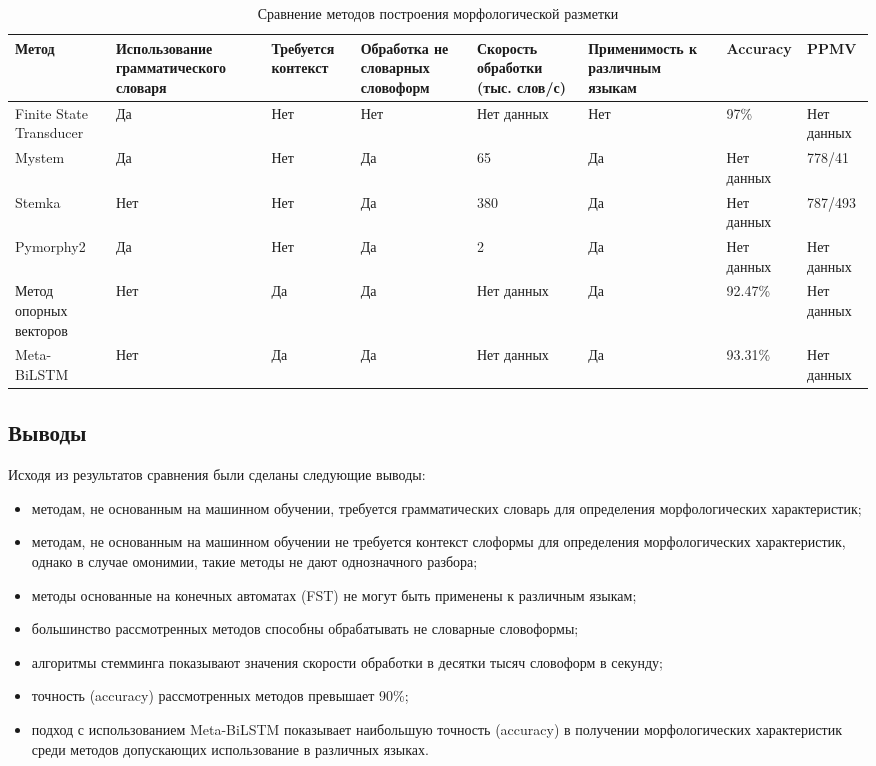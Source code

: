 \begin{table}
	\centering
	\caption{Сравнение методов построения морфологической разметки}
	\begin{tabular}{|p{3cm}|p{3cm}|p{3cm}|p{3cm}|p{3cm}|p{3cm}|p{}|p{}|}
		\hline
		Метод & Использование грамматического словаря & Требуется контекст & Обработка не словарных словоформ & Скорость обработки (тыс. слов/с) & Применимость к различным языкам & Accuracy & PPMV \\\hline
		Finite State Transducer & Да & Нет & Нет & Нет данных & Нет & 97\% & Нет данных\\\hline
		Mystem & Да & Нет & Да & 65 & Да & Нет данных & 778/41\\\hline
		Stemka & Нет & Нет & Да & 380 & Да & Нет данных & 787/493\\\hline
		Pymorphy2 & Да & Нет & Да & 2 & Да & Нет данных & Нет данных\\\hline
		Метод опорных векторов & Нет & Да & Да & Нет данных & Да & 92.47\% & Нет данных\\\hline
		Meta-BiLSTM & Нет & Да & Да & Нет данных & Да & 93.31\% & Нет данных\\\hline
	\end{tabular}
	\label{tab:compare_morph}
\end{table}

\subsection{Выводы}

Исходя из результатов сравнения были сделаны следующие выводы:
\begin{itemize}
	\item методам, не основанным на машинном обучении, требуется грамматических словарь для определения морфологических характеристик;
	\item методам, не основанным на машинном обучении не требуется контекст слоформы для определения морфологических характеристик, однако в случае омонимии, такие методы не дают однозначного разбора;
	\item методы основанные на конечных автоматах (FST) не могут быть применены к различным языкам;
	\item большинство рассмотренных методов способны обрабатывать не словарные словоформы;
	\item алгоритмы стемминга показывают значения скорости обработки в десятки тысяч словоформ в секунду;
	\item точность (accuracy) рассмотренных методов превышает 90\%;
	\item подход с использованием Meta-BiLSTM показывает наибольшую точность (accuracy) в получении морфологических характеристик среди методов допускающих использование в различных языках.
\end{itemize}

